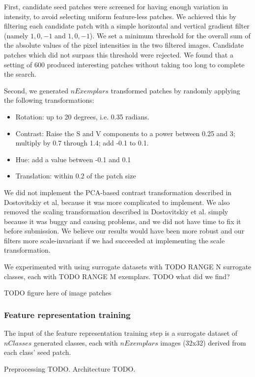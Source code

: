 \documentclass{article}
\newenvironment{itemizedense}{
\begin{itemize}
  \setlength{\itemsep}{1pt}
  \setlength{\parskip}{0pt}
  \setlength{\parsep}{0pt}
}{\end{itemize}}
\begin{document}
First, candidate seed patches were screened for having enough variation in intensity, to avoid selecting uniform feature-less patches. We achieved this by filtering each candidate patch with a simple horizontal and vertical gradient filter (namely ${{1, 0, -1}}$ and ${{1},{0},{-1}}$). We set a minimum threshold for the overall sum of the absolute values of the pixel intensities in the two filtered images. Candidate patches which did not surpass this threshold were rejected. We found that a setting of $600$ produced interesting patches without taking too long to complete the search.

Second, we generated $nExemplars$ transformed patches by randomly applying the following transformations:

\begin{itemizedense}
\item Rotation: up to 20 degrees, i.e. 0.35 radians.
\item Contrast: Raise the S and V components to a power between 0.25 and 3; multiply by 0.7 through 1.4; add -0.1 to 0.1.
\item Hue: add a value between -0.1 and 0.1
\item Translation: within 0.2 of the patch size
\end{itemizedense}

We did not implement the PCA-based contrast transformation described in Dostovitskiy et al, because it was more complicated to implement. We also removed the scaling transformation described in Dostovitskiy et al. simply because it was buggy and causing problems, and we did not have time to fix it before submission. We believe our results would have been more robust and our filters more scale-invariant if we had succeeded at implementing the scale transformation.

We experimented with using surrogate datasets with TODO RANGE N surrogate classes, each with TODO RANGE M exemplars. TODO what did we find?

TODO figure here of image patches

\subsubsection*{Feature representation training}
The input of the feature representation training step is a surrogate dataset of $nClasses$ generated classes, each with $nExemplars$ images (32x32) derived from each class' seed patch.

Preprocessing TODO. Architecture TODO. 
\end{document}
